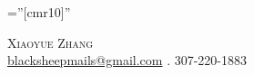 \documentclass[a4paper,10pt]{article}
\begin{document}

\pagestyle{empty} %

\font\fb=''[cmr10]'' %

\par{\centering
		{\Huge \textsc{Xiaoyue Zhang}\\}
	 \centering
	    {\href{mailto:blacksheepmails@gmail.com}{blacksheepmails@gmail.com} . 307-220-1883 }
	\par}



\end{document}
